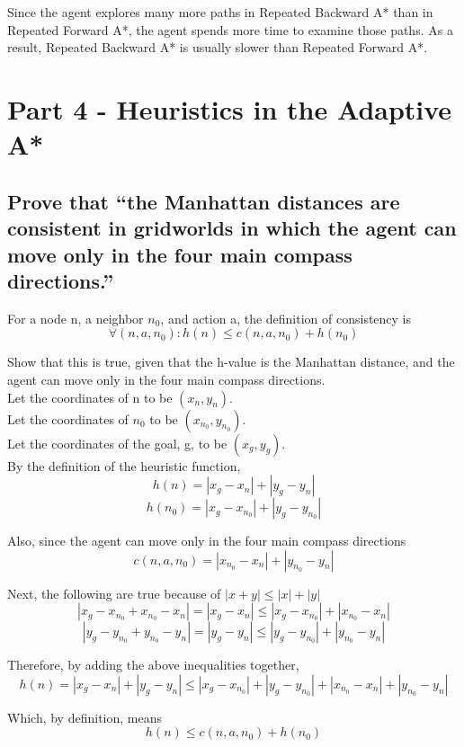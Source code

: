 \documentclass{article}
\begin{document}
Since the agent explores many more paths in Repeated Backward A* than in Repeated Forward A*, the agent spends more time to examine those paths. As a result, Repeated Backward A* is usually slower than Repeated Forward A*.


\section{Part 4 - Heuristics in the Adaptive A*}

\subsection{Prove that “the Manhattan distances are consistent in gridworlds in which the agent can move only in the four main compass directions.”}
For a node n, a neighbor $n_0$, and action a, the definition of consistency is \[ \forall (n,a,n_0): h(n) \leq  c(n,a,n_0)+h(n_0)\]

Show that this is true, given that the h-value is the Manhattan distance, and the agent can move only in the four main compass directions.\\

Let the coordinates of n to be $(x_n,y_n)$.\\
Let the coordinates of $n_0$ to be $(x_{n_0},y_{n_0})$.\\
Let the coordinates of the goal, g, to be $(x_g,y_g)$.\\

By the definition of the heuristic function,
\[ h(n)=|x_g-x_n|+|y_g-y_n|\]
\[ h(n_0)=|x_g-x_{n_0}|+|y_g-y_{n_0}|\]

Also, since the agent can move only in the four main compass directions
\[ c(n,a,n_0)=|x_{n_0}-x_n|+|y_{n_0}-y_n|\]

Next, the following are true because of $|x+y|\leq|x|+|y|$
\[ |x_g-x_{n_0}+x_{n_0}-x_n|=|x_g-x_n|\leq|x_g-x_{n_0}|+|x_{n_0}-x_n| \]
\[ |y_g-y_{n_0}+y_{n_0}-y_n|=|y_g-y_n|\leq|y_g-y_{n_0}|+|y_{n_0}-y_n| \]

Therefore, by adding the above inequalities together,
\[ h(n)=|x_g-x_n|+|y_g-y_n|\leq|x_g-x_{n_0}|+|y_g-y_{n_0}|+|x_{n_0}-x_n|+|y_{n_0}-y_n| \]

Which, by definition, means
\[h(n)\leq c(n,a,n_0)+h(n_0) \] 
\end{document}
